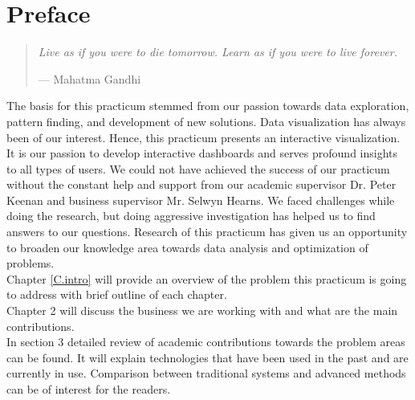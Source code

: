 %
%
%
%

\chapter*{Preface}


\begin{quote}
\noindent\textit{Live as if you were to die tomorrow. Learn as if you were to live forever.}

\hspace{2cm}--- Mahatma Gandhi
\end{quote}

The basis for this practicum stemmed from our passion towards data exploration, pattern finding, and development of new solutions. Data visualization has always been of our interest. Hence, this practicum presents an interactive visualization. It is our passion to develop interactive dashboards and serves profound insights to all types of users. We could not have achieved the success of our practicum without the constant help and support from our academic supervisor Dr. Peter Keenan and business supervisor Mr. Selwyn Hearns. We faced challenges while doing the research, but doing aggressive investigation has helped us to find answers to our questions. Research of this practicum has given us an opportunity to broaden our knowledge area towards data analysis and optimization of problems.\\

Chapter \ref{C.intro} will provide an overview of the problem this practicum is going to address with brief outline of each chapter.\\

Chapter 2 will discuss the business we are working with and what are the main contributions.\\

In section 3 detailed review of academic contributions towards the problem areas can be found. It will explain technologies that have been used in the past and are currently in use. Comparison between traditional systems and advanced methods can be of interest for the readers.\\

